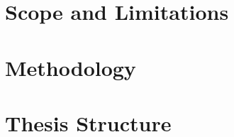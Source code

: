 \section{Scope and Limitations}
\label{sec:scope}

\section{Methodology}
\label{sec:method}

\section{Thesis Structure}
